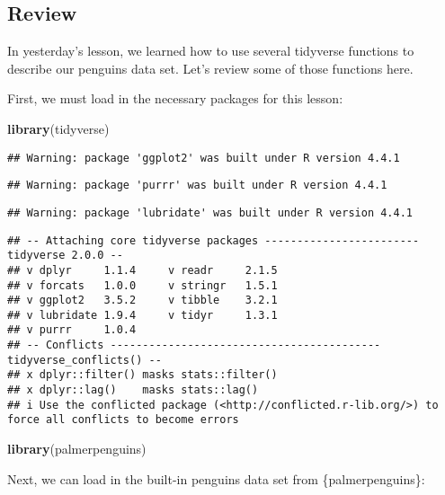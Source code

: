 \documentclass[
]{article}
\author{Katie Willi}
\date{2025-06-03}
\newenvironment{Shaded}{\begin{snugshade}}{\end{snugshade}}
\newcommand{\FunctionTok}[1]{\textcolor[rgb]{0.13,0.29,0.53}{\textbf{#1}}}
\newcommand{\NormalTok}[1]{#1}
\begin{document}
\subsection{Review}\label{review}

In yesterday's lesson, we learned how to use several tidyverse functions
to describe our penguins data set. Let's review some of those functions
here.

First, we must load in the necessary packages for this lesson:

\begin{Shaded}
\begin{Highlighting}[]
\FunctionTok{library}\NormalTok{(tidyverse)}
\end{Highlighting}
\end{Shaded}

\begin{verbatim}
## Warning: package 'ggplot2' was built under R version 4.4.1
\end{verbatim}

\begin{verbatim}
## Warning: package 'purrr' was built under R version 4.4.1
\end{verbatim}

\begin{verbatim}
## Warning: package 'lubridate' was built under R version 4.4.1
\end{verbatim}

\begin{verbatim}
## -- Attaching core tidyverse packages ------------------------ tidyverse 2.0.0 --
## v dplyr     1.1.4     v readr     2.1.5
## v forcats   1.0.0     v stringr   1.5.1
## v ggplot2   3.5.2     v tibble    3.2.1
## v lubridate 1.9.4     v tidyr     1.3.1
## v purrr     1.0.4     
## -- Conflicts ------------------------------------------ tidyverse_conflicts() --
## x dplyr::filter() masks stats::filter()
## x dplyr::lag()    masks stats::lag()
## i Use the conflicted package (<http://conflicted.r-lib.org/>) to force all conflicts to become errors
\end{verbatim}

\begin{Shaded}
\begin{Highlighting}[]
\FunctionTok{library}\NormalTok{(palmerpenguins)}
\end{Highlighting}
\end{Shaded}

Next, we can load in the built-in penguins data set from
\{palmerpenguins\}:
\end{document}
